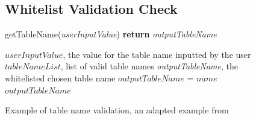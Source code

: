\documentclass{ueacmpstyle}
\begin{document}
          \begin{figure}[ht]
            \subsection{Whitelist Validation Check}
            \label{sec:whitelist-valid}
            \centering
            \begin{algorithm}[H]
            \caption{getTableName(\emph{userInputValue}) {\bf return} \emph{outputTableName}}
              \begin{algorithmic}[1]
                \Require $userInputValue$, the value for the table name inputted by the user
                \Require $tableNameList$, list of valid table names
                \Ensure \emph{outputTableName}, the whitelisted chosen table name
                    \State $outputTableName$ = $name$
                  \EndIf
                \EndFor
                \State \Return $outputTableName$
              \end{algorithmic}
            \end{algorithm}
            \caption{Example of table name validation, an adapted example from 
                     \cite{OWASPSqlInjectionPrevention}}
            \label{fig:whitelist-valid}
          \end{figure}
\end{document}
